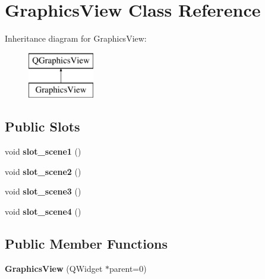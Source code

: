 \hypertarget{class_graphics_view}{\section{Graphics\-View Class Reference}
\label{class_graphics_view}
}
Inheritance diagram for Graphics\-View\-:\begin{figure}[H]
\begin{center}
\leavevmode
\includegraphics[height=2.000000cm]{class_graphics_view}
\end{center}
\end{figure}
\subsection*{Public Slots}
\begin{DoxyCompactItemize}
\item 
\hypertarget{class_graphics_view_a8b2bf57348fb440f8112234d5a262787}{void {\bfseries slot\-\_\-scene1} ()}\label{class_graphics_view_a8b2bf57348fb440f8112234d5a262787}

\item 
\hypertarget{class_graphics_view_a36e99b02703b60e0dd1b58c77fae2c05}{void {\bfseries slot\-\_\-scene2} ()}\label{class_graphics_view_a36e99b02703b60e0dd1b58c77fae2c05}

\item 
\hypertarget{class_graphics_view_a1a35e4c18431b529629fa51b0d4fed97}{void {\bfseries slot\-\_\-scene3} ()}\label{class_graphics_view_a1a35e4c18431b529629fa51b0d4fed97}

\item 
\hypertarget{class_graphics_view_a5afe973b24faa1b72476599bc70eedd7}{void {\bfseries slot\-\_\-scene4} ()}\label{class_graphics_view_a5afe973b24faa1b72476599bc70eedd7}

\end{DoxyCompactItemize}
\subsection*{Public Member Functions}
\begin{DoxyCompactItemize}
\item 
\hypertarget{class_graphics_view_a3704e176eba4e8036647eb85395569ff}{{\bfseries Graphics\-View} (Q\-Widget $\ast$parent=0)}\label{class_graphics_view_a3704e176eba4e8036647eb85395569ff}

\end{DoxyCompactItemize}
